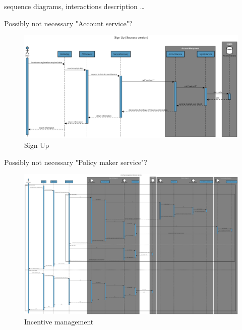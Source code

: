 
sequence diagrams, interactions description \ldots

Possibly not necessary "Account service"?
\begin{figure}[H]
	\centering
    \includegraphics[width=\textwidth]{Images/sequence-diagram/sign-up.png}
	\caption{\label{fig:se_sign_up}Sign Up}
\end{figure}

Possibly not necessary "Policy maker service"?
\begin{figure}[H]
	\centering
    \includegraphics[width=\textwidth]{Images/sequence-diagram/incentive-management.png}
	\caption{\label{fig:se_incentive}Incentive management}
\end{figure}

